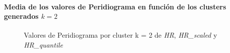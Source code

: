 \paragraph{Media de los valores de Peridiograma en función de los clusters generados $k = 2$}

\begin{figure}[H]
    \centering
    \caption{Valores de Peridiograma por cluster k = 2 de \textit{HR}, \textit{HR\_scaled} y \textit{HR\_quantile}}\label{fig:per_cls_fc}
\end{figure}

